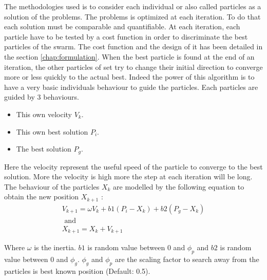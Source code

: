 The methodologies used is to consider each individual or also called particles as a solution of the problems. The problems is optimized at each iteration. To do that each solution must be comparable and quantifiable. At each iteration, each particle have to be tested by a cost function in order to discriminate the best particles of the swarm. The cost function and the design of it has been detailed in the section \ref{chap:formulation}.
When the best particle is found at the end of an iteration, the other particles of set try to change their initial direction to converge more or less quickly to the actual best. 
Indeed the power of this algorithm is to have a very basic individuals behaviour to guide the particles. 
Each particles are guided by 3 behaviours.
 \begin{itemize}
 \item  This own velocity $V_k$. 
 \item  This own best solution $P_i$.
 \item  The best solution $P_g$.
\end{itemize}  
Here the velocity represent the useful speed of the particle to converge to the best solution. More the velocity is high more the step at each iteration will be long. 
The behaviour of the particles $X_k$ are modelled by the following equation to obtain the new position $X_{k+1}$ :
\begin{equation} \label{eq:PSO}
\begin{split}
 V_{k+1}= \omega V_k +b1(P_i -X_k)+b2(P_g-X_k)
\\
\mbox{ and } \\ X_{k+1}=X_k+V_{k+1}
\end{split}
\end{equation}

Where $\omega$ is the inertia. $b1$ is random value between 0 and $\phi_p$ and $b2$ is random value between 0 and $\phi_g$. $\phi_g$ and $\phi_p$  are the scaling factor to search away from the particles is best known position (Default: 0.5). 


